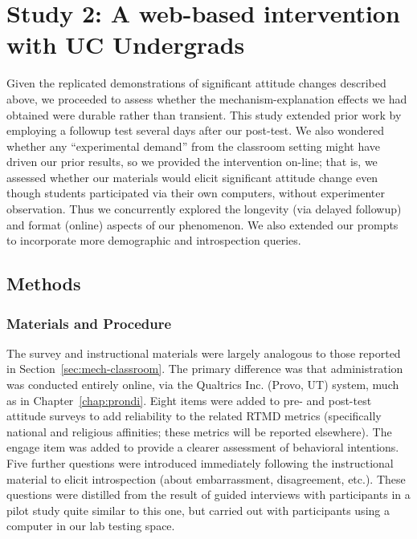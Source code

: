 \section{Study 2: A web-based intervention with UC Undergrads}

Given the replicated demonstrations of significant attitude changes described
above, we proceeded to assess whether the mechanism-explanation effects we had
obtained were durable rather than transient. This study extended prior work by
employing a followup test several days after our post-test. We also wondered
whether any ``experimental demand'' from the classroom setting might have driven
our prior results, so we provided the intervention on-line; that is, we assessed
whether our materials would elicit significant attitude change even though
students participated via their own computers, without experimenter observation.
Thus we concurrently explored the longevity (via delayed followup) and format
(online) aspects of our phenomenon. We also extended our prompts to incorporate
more demographic and introspection queries.

\subsection{Methods}
\label{sec:mech-online-methods}

\subsubsection{Materials and Procedure}

The survey and instructional materials were largely analogous to those reported
in Section~\ref{sec:mech-classroom}. 
The primary difference was that
administration was conducted entirely online, via the Qualtrics Inc. (Provo, UT)
system, much as in Chapter~\ref{chap:prondi}. Eight items were added to pre- and
post-test attitude surveys to add reliability to the related RTMD metrics
(specifically national and religious
affinities; these metrics will be reported elsewhere). The \textsf{engage} item
was added to provide a clearer assessment of behavioral intentions. Five further
questions were introduced immediately following the instructional material to
elicit introspection (about embarrassment, disagreement, etc.). These questions
were distilled from the result of guided interviews with participants in a pilot
study quite similar to this one, but carried out with participants using a
computer in our lab testing space.

